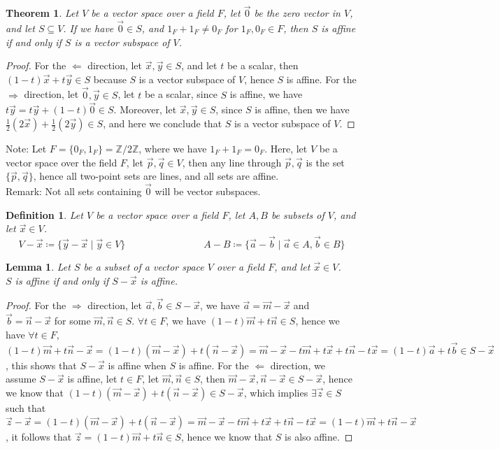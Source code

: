 \documentclass[11pt,oneside]{book}
\theoremstyle{break}
\theoremstyle{break}
\newtheorem{thm}{Theorem}[section]
\newtheorem{lem}{Lemma}[thm]
\newtheorem{defn}{Definition}[corL]
\newcommand{\Z}{\mathbb{Z}}
\newcommand{\note}{\color{red}Note: \color{black}}
\newcommand{\remark}{\color{blue}Remark: \color{black}}
\begin{document}
\begin{thm}
Let $V$ be a vector space over a field $F$, let $\vec{0}$ be the zero vector in $V$, and let $S\subseteq V$. If we have $\vec{0} \in S$, and $1_F+1_F \neq 0_F$ for $1_F, 0_F \in F$, then $S$ is affine if and only if $S$ is a vector subspace of $V$.
\end{thm}
\begin{proof}
For the $\Leftarrow$ direction, let $\vec{x},\vec{y}\in S$, and let $t$ be a scalar, then $(1-t)\vec{x}+t\vec{y} \in S$ because $S$ is a vector subspace of $V$, hence $S$ is affine. For the $\Rightarrow$ direction, let $\vec{0},\vec{y}\in S$, let $t$ be a scalar, since $S$ is affine, we have $t\vec{y}=t\vec{y}+(1-t)\vec{0}\in S$. Moreover, let $\vec{x},\vec{y} \in S$, since $S$ is affine, then we have $\frac{1}{2}(2\vec{x})+\frac{1}{2}(2\vec{y})\in S$, and here we conclude that $S$ is a vector subspace of $V$.
\end{proof}

\note Let $F = \{0_F,1_F\} = \Z/2\Z$, where we have $1_F+1_F=0_F$. Here, let $V$ be a vector space over the field $F$, let $\vec{p},\vec{q}\in V$, then any line through $\vec{p},\vec{q}$ is the set $\{\vec{p},\vec{q}\}$, hence all two-point sets are lines, and all sets are affine. \\

\remark Not all sets containing $\vec{0}$ will be vector subspaces.

\begin{defn}
Let $V$ be a vector space over a field $F$, let $A,B$ be subsets of $V$, and let $\vec{x}\in V$.
$$V-\vec{x} \coloneqq \{\vec{y}-\vec{x} \mid \vec{y} \in V\} \qquad\qquad\qquad\qquad
A-B \coloneqq \{ \vec{a}-\vec{b}\mid \vec{a} \in A,\vec{b} \in B\}$$
\end{defn}

\begin{lem}
Let $S$ be a subset of a vector space $V$ over a field $F$, and let $\vec{x}\in V$.\\ $S$ is affine if and only if $S-\vec{x}$ is affine.
\end{lem}
\begin{proof}
For the $\Rightarrow$ direction, let $\vec{a},\vec{b}\in S-\vec{x}$, we have $\vec{a} = \vec{m}-\vec{x}$ and $\vec{b} =\vec{n}-\vec{x}$ for some $\vec{m},\vec{n} \in S$. $\forall t \in F$, we have $(1-t)\vec{m}+t\vec{n} \in S$, hence we have $\forall t \in F$, $(1-t)\vec{m}+t\vec{n} -\vec{x}=(1-t)(\vec{m}-\vec{x})+t(\vec{n}-\vec{x}) = \vec{m}-\vec{x}-t\vec{m}+t\vec{x}+t\vec{n}-t\vec{x} = (1-t)\vec{a}+t\vec{b} \in S-\vec{x}$, this shows that $S-\vec{x}$ is affine when $S$ is affine. For the $\Leftarrow$ direction, we assume $S-\vec{x}$ is affine, let $t \in F$, let $\vec{m},\vec{n} \in S$, then $\vec{m}-\vec{x},\vec{n}-\vec{x}\in S-\vec{x}$, hence we know that $(1-t)(\vec{m}-\vec{x})+t(\vec{n}-\vec{x}) \in S-\vec{x}$, which implies $\exists\vec{z}\in S$ such that $\vec{z}-\vec{x} = (1-t)(\vec{m}-\vec{x})+t(\vec{n}-\vec{x}) = \vec{m}-\vec{x}-t\vec{m}+t\vec{x}+t\vec{n}-t\vec{x} = (1-t)\vec{m}+t\vec{n}-\vec{x}$, it follows that $\vec{z} = (1-t)\vec{m}+t\vec{n} \in S$, hence we know that $S$ is also affine. 
\end{proof}
\end{document}
